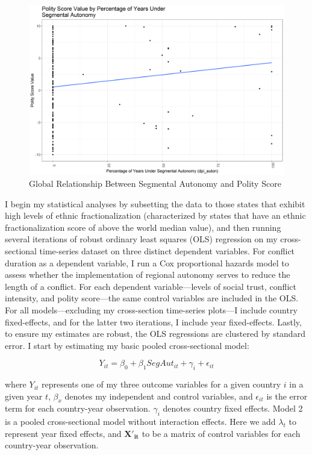 \documentclass[12pt]{article}
\begin{document}
\begin{figure}[!htbp]
	\begin{center}
		\includegraphics[width = 6in]{csts_polity4_polity_score.png}
	\end{center}
	\caption{Global Relationship Between Segmental Autonomy and Polity Score}
\end{figure}

I begin my statistical analyses by subsetting the data to those states that exhibit high levels of ethnic fractionalization (characterized by states that have an ethnic fractionalization score of above the world median value), and then running several iterations of robust ordinary least squares (OLS) regression on my cross-sectional time-series dataset on three distinct dependent variables. For conflict duration as a dependent variable, I run a Cox proportional hazards model to assess whether the implementation of regional autonomy serves to reduce the length of a conflict. For each dependent variable---levels of social trust, conflict intensity, and polity score---the same control variables are included in the OLS. For all models---excluding my cross-section time-series plots---I include country fixed-effects, and for the latter two iterations, I include year fixed-effects. Lastly, to ensure my estimates are robust, the OLS regressions are clustered by standard error. I start by estimating my basic pooled cross-sectional model: 

\begin{equation}
Y_{it} = \beta_0 + \beta_1 SegAut_{it} + \gamma_i + \epsilon_{it}
\end{equation}

where $Y_{it}$ represents one of my three outcome variables for a given country $i$ in a given year $t$, $\beta_x$ denotes my independent and control variables, and $\epsilon_{it}$ is the error term for each country-year observation. $\gamma_i$ denotes country fixed effects. Model 2 is a pooled cross-sectional model without interaction effects. Here we add $\lambda_t$ to represent year fixed effects, and $\mathbf{X'_{it}}$ to be a matrix of control variables for each country-year observation. 
\end{document}
